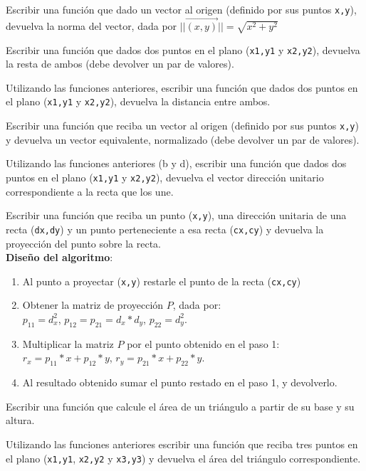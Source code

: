 \begin{partes}
    \item Escribir una función que dado un vector al origen (definido por sus
 puntos \verb!x,y!), devuelva la norma del vector, dada por 
 $||\vec{(x,y)}||=\sqrt{x^2+y^2}$
 
    \item Escribir una función que dados dos puntos en el plano (\verb!x1,y1! y 
 \verb!x2,y2!), devuelva la resta de ambos (debe devolver un par de
 valores).
 
    \item Utilizando las funciones anteriores, escribir una función que dados dos
 puntos en el plano (\verb!x1,y1! y \verb!x2,y2!), devuelva la distancia
 entre ambos.

    \item Escribir una función que reciba un vector al origen (definido por sus
 puntos \verb!x,y!) y devuelva un vector equivalente, normalizado (debe
 devolver un par de valores). 

    \item Utilizando las funciones anteriores (b y d), escribir una función que
 dados dos puntos en el plano (\verb!x1,y1! y \verb!x2,y2!), devuelva el
 vector dirección unitario correspondiente a la recta que los une.

    \item Escribir una función que reciba un punto (\verb!x,y!), una dirección
 unitaria de una recta (\verb!dx,dy!) y un punto perteneciente a esa recta
 (\verb!cx,cy!) y devuelva la proyección del punto sobre la recta. \\
 {\bf Diseño del algoritmo}:
 \begin{enumerate}
     \setlength{\itemsep}{0pt}
     \setlength{\parsep}{0pt}
     \item Al punto a proyectar (\verb!x,y!) restarle el punto de la recta
 (\verb!cx,cy!) 
     \item Obtener la matriz de proyección $P$, dada por:  \\
 $p_{11} = d_x^2$,  $p_{12} = p_{21} = d_x*d_y$, $p_{22} = d_y^2$. 
     \item Multiplicar la matriz $P$ por el punto obtenido en el paso 1: \\
 $r_x = p_{11} * x + p_12 * y$, $r_y = p_{21} * x + p_{22} * y$. 
     \item Al resultado obtenido sumar el punto restado en el paso 1, y
 devolverlo.
 \end{enumerate}

    \item Escribir una función que calcule el área de un triángulo a partir de
 su base y su altura. 

    \item Utilizando las funciones anteriores escribir una función que reciba
 tres puntos en el plano (\verb!x1,y1!, \verb!x2,y2! y \verb!x3,y3!) y
 devuelva el área del triángulo correspondiente.
\end{partes}
